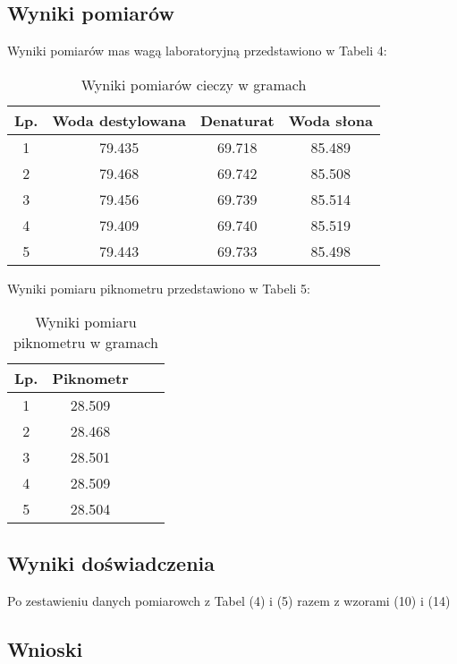 \documentclass{article} %
\begin{document}
\subsection{Wyniki pomiarów}

Wyniki pomiarów mas wagą laboratoryjną przedstawiono w Tabeli 4:

\begin{table}[h!]
\centering
\begin{tabular}{|c|c|c|c|}
\hline
\textbf{Lp.} & \textbf{Woda destylowana} & \textbf{Denaturat} & \textbf{Woda słona}\\
\hline
1 & 79.435 & 69.718 & 85.489\\
2 & 79.468 & 69.742 & 85.508\\
3 & 79.456 & 69.739 & 85.514\\
4 & 79.409 & 69.740 & 85.519\\
5 & 79.443 & 69.733 & 85.498\\
\hline
\end{tabular}
\caption{Wyniki pomiarów cieczy w gramach}
\label{table:students}
\end{table}

Wyniki pomiaru piknometru przedstawiono w Tabeli 5:

\begin{table}[h!]
\centering
\begin{tabular}{|c|c|c|c|}
\hline
\textbf{Lp.} & \textbf{Piknometr}\\
\hline
1 & 28.509\\
2 & 28.468\\
3 & 28.501\\
4 & 28.509\\
5 & 28.504\\
\hline
\end{tabular}
\caption{Wyniki pomiaru piknometru w gramach}
\label{table:students}
\end{table}
\subsection{Wyniki doświadczenia}
Po zestawieniu danych pomiarowch z Tabel (4) i (5) razem z wzorami (10) i (14)
\subsection{Wnioski}
\end{document}
